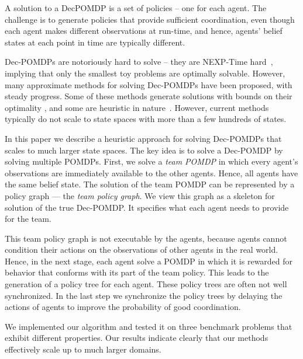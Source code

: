 \documentclass[letterpaper]{article}
\theoremstyle{definition}
\begin{document}
A solution to a DecPOMDP is a set of policies -- one for each agent.
The challenge is to generate policies that provide sufficient coordination, even though each agent makes different observations at run-time,
and hence, agents' belief states at each point in time are typically different.

Dec-POMDPs are notoriously hard to solve -- they are NEXP-Time hard~\cite{DECPOMDPCOMP}, implying that only the smallest toy problems are optimally solvable.
However, many approximate methods for solving Dec-POMDPs have been proposed, with steady progress. Some of these methods generate solutions with bounds on
their optimality \cite{GMAAICE,MBDP,DICEPS}, and some are heuristic in nature~\cite{JESP}. However, current methods typically do not scale to state spaces with more than a few hundreds of states.


In this paper we describe a heuristic approach for solving Dec-POMDPs that scales to much larger state spaces. The key idea is to solve a Dec-POMDP by
solving multiple POMDPs. First, we solve a {\em team POMDP}
in which every agent's observations are
immediately available to the other agents. Hence, all agents have the same belief state.  The solution of the team
POMDP can be represented by a policy graph --- the {\em team policy graph}. We view this
graph as a skeleton for solution of the true Dec-POMDP. It specifies what each agent needs to provide for the team. 

This team policy graph is not executable by the agents, because agents cannot condition their actions on the observations of other agents in the real world. Hence, in the next stage, each agent solve a POMDP in which it is rewarded for behavior that conforms with its part of the team policy. This leads to the generation of a policy tree for each agent. 
These policy trees are often not well synchronized. In the last step we synchronize the policy trees by delaying the actions of agents to improve the probability of good coordination. 

 We implemented our algorithm and tested it on three benchmark problems that exhibit different properties. Our results indicate clearly that our methods effectively scale up to much larger domains.
 
\end{document}
